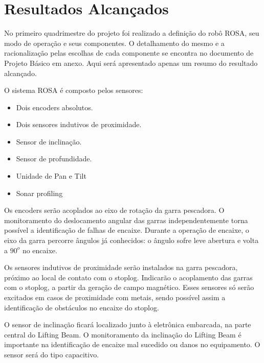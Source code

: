 
\setcounter{secnumdepth}{3}
\section{Resultados Alcançados}
\label{resultados_alcancados}

No primeiro quadrimestre do projeto foi realizado a definição do robô ROSA, seu modo de operação e seus componentes. O detalhamento do mesmo e a racionalização pelas escolhas de cada componente se encontra no documento de Projeto Básico em anexo. Aqui será apresentado apenas um resumo do resultado alcançado.

O sistema ROSA é composto pelos sensores:
\begin{itemize}
\item Dois encoders absolutos.
\item Dois sensores indutivos de proximidade.
\item Sensor de inclinação.
\item Sensor de profundidade.
\item Unidade de Pan e Tilt
\item Sonar profiling
\end{itemize}

Os encoders serão acoplados ao eixo de rotação da garra pescadora. O
monitoramento do deslocamento angular das garras independentemente torna
possível a identificação de falhas de encaixe. Durante a operação de encaixe, o
eixo da garra percorre ângulos já conhecidos: o ângulo sofre leve abertura e
volta a $90^o$ no encaixe. 

Os sensores indutivos de proximidade serão instalados na garra pescadora,
próximo ao local de contato com o stoplog. Indicarão o acoplamento das garras
com o stoplog, a partir da geração de campo magnético. Esses sensores só serão
excitados em casos de proximidade com metais, sendo possível assim a
identificação de obstáculos no encaixe do stoplog. 

O sensor de inclinação ficará localizado junto à eletrônica embarcada, na parte
central do Lifting Beam. O monitoramento da inclinação do Lifting Beam é
importante na identificação de encaixe mal sucedido ou danos no equipamento. O
sensor será do tipo capacitivo.

